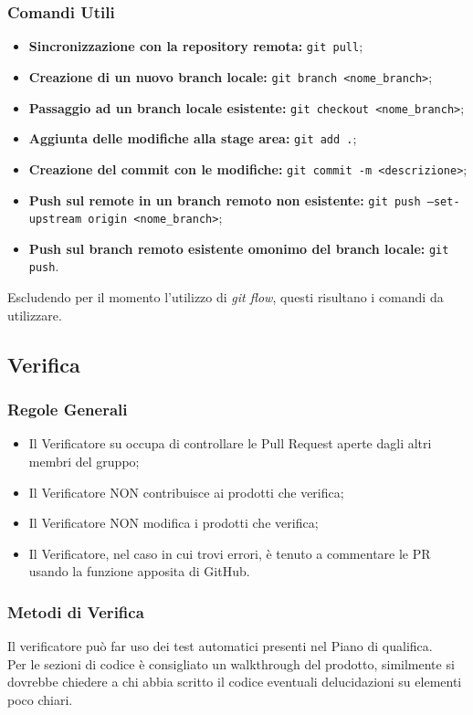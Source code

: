 \documentclass[a4paper, 12pt]{article}
\begin{document}
\subsubsection{Comandi Utili}
\begin{itemize}
    \item \textbf{Sincronizzazione con la repository remota:} \texttt{git pull};
    \item \textbf{Creazione di un nuovo branch locale:} \texttt{git branch <nome\_branch>};
    \item \textbf{Passaggio ad un branch locale esistente:} \texttt{git checkout <nome\_branch>};
    \item \textbf{Aggiunta delle modifiche alla stage area:} \texttt{git add .};
    \item \textbf{Creazione del commit con le modifiche:} \texttt{git commit -m <descrizione>};
    \item \textbf{Push sul remote in un branch remoto non esistente:} \texttt{git push --set-upstream origin <nome\_branch>};
    \item \textbf{Push sul branch remoto esistente omonimo del branch locale:} \texttt{git push}.
\end{itemize}
Escludendo per il momento l'utilizzo di \textit{git flow}, questi risultano i comandi da utilizzare.

\subsection{Verifica}
\subsubsection{Regole Generali}
\begin{itemize}
    \item Il Verificatore su occupa di controllare le Pull Request aperte dagli altri membri del gruppo;
    \item Il Verificatore NON contribuisce ai prodotti che verifica;
    \item Il Verificatore NON modifica i prodotti che verifica;
    \item Il Verificatore, nel caso in cui trovi errori, è tenuto a commentare le PR usando la funzione apposita di GitHub.
\end{itemize}
\subsubsection{Metodi di Verifica}
Il verificatore può far uso dei test automatici presenti nel Piano di qualifica.\\
Per le sezioni di codice è consigliato un walkthrough del prodotto, similmente si dovrebbe chiedere a chi abbia scritto il codice eventuali delucidazioni su elementi poco chiari.
\end{document}
